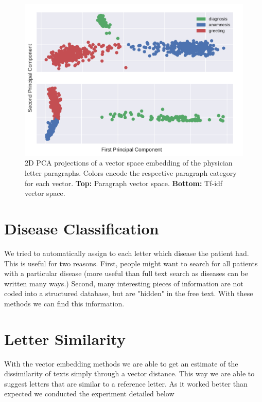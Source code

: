 \begin{figure}
	\includegraphics[width=\linewidth]{figures/para2vec_tfidf_pca}
	\caption{2D PCA projections of a vector space embedding of the physician letter paragraphs. Colors encode the respective paragraph category for each vector. \textbf{Top:} Paragraph vector space.  \textbf{Bottom:} Tf-idf vector space.}
	\label{fig:pv_tf_pca}
\end{figure}

\section{Disease Classification}
We tried to automatically assign to each letter which disease the patient had. This is useful for two reasons. First, people might want to search for all patients with a particular disease (more useful than full text search as diseases can be written many ways.) Second, many interesting pieces of information are not coded into a structured database, but are "hidden" in the free text. With these methods we can find this information.

\section{Letter Similarity}
With the vector embedding methods we are able to get an estimate of the dissimilarity of texts simply through a vector distance. This way we are able to suggest letters that are similar to a reference letter. As it worked better than expected we conducted the experiment detailed below


